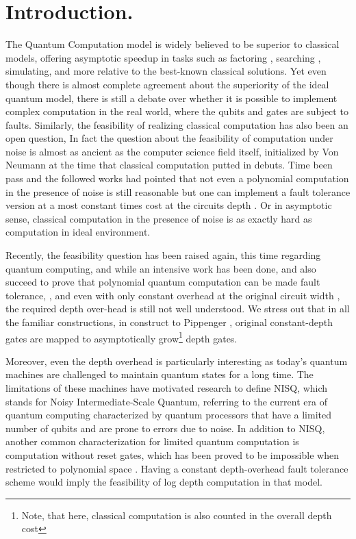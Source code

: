 
  \section{Introduction.} 
  
The Quantum Computation model is widely believed to be superior to classical models, offering asymptotic speedup in tasks such as factoring \cite{Shor_1997}, searching \cite{grover1996fast}, simulating, and more relative to the best-known classical solutions. Yet even though there is almost complete agreement about the superiority of the ideal quantum model, there is still a debate over whether it is possible to implement complex computation in the real world, where the qubits and gates are subject to faults. Similarly, the feasibility of realizing classical computation has also been an open question, In fact the question about the feasibility of computation under noise is almost as ancient as the computer science field itself, initialized by Von Neumann \cite{Neumann+1956+43+98} at the time that classical computation putted in debuts. Time been pass and the followed works had pointed that not even a polynomial computation in the presence of noise is still reasonable but one can implement a fault tolerance version at a most constant times cost at the circuits depth \cite{Pippenger}. Or in asymptotic sense, classical computation in the presence of noise is as exactly hard as computation in ideal environment.  

Recently, the feasibility question has been raised again, this time regarding quantum computing, and while an intensive work has been done, and also succeed to prove that polynomial quantum computation can be made fault tolerance, \cite{aharonov1999faulttolerant},\cite{gottesman2014faulttolerant} and even with only constant overhead at the original circuit width \cite{grospellier:tel-03364419}, the required depth over-head is still not well understood. We stress out that in all the familiar constructions, in construct to Pippenger \cite{Pippenger}, original constant-depth gates are mapped to asymptotically grow\footnote{Note, that here, classical computation is also counted in the overall depth cost} depth gates. 


Moreover, even the depth overhead is particularly interesting as today's quantum machines are challenged to maintain quantum states for a long time. The limitations of these machines have motivated research to define NISQ, which stands for Noisy Intermediate-Scale Quantum, referring to the current era of quantum computing characterized by quantum processors that have a limited number of qubits and are prone to errors due to noise. In addition to NISQ, another common characterization for limited quantum computation is computation without reset gates, which has been proved to be impossible when restricted to polynomial space \cite{aharonov1996limitationsnoisyreversiblecomputation}. Having a constant depth-overhead fault tolerance scheme would imply the feasibility of log depth computation in that model.
  

